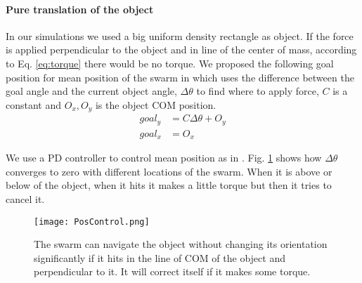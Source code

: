 \paragraph{Pure translation of the object} \label{para:PureTranslation}
In our simulations we used a big uniform density rectangle as object. If the force is applied perpendicular to the object and in line of the center of mass, according to Eq. \ref{eq:torque} there would be no torque. We proposed the following goal position for mean position of the swarm in which uses the difference between the goal angle and the current object angle, $\Delta \theta$ to find where to apply force, $C$ is a constant and $O_x,O_y$ is the object COM position.
\begin{align}\nonumber
goal_y &= C \Delta \theta + O_y\\
goal_x &= O_x
\end{align}

We use a PD controller to control mean position as in \cite{ShahrokhiIROS2015}. Fig. \ref{fig:PosControlFig} shows how $\Delta \theta$ converges to zero with different locations of the swarm. When it is above or below of the object, when it hits it makes a little torque but then it tries to cancel it.
\begin{figure}
\begin{center}
	\texttt{[image: PosControl.png]}
\end{center}
\vspace{-1em}
\caption{\label{fig:PosControlFig}
The swarm can navigate the object without changing its orientation significantly if it hits in the line of COM of the object and perpendicular to it. It will correct itself if it makes some torque.
}
\vspace{-1em}
\end{figure}

